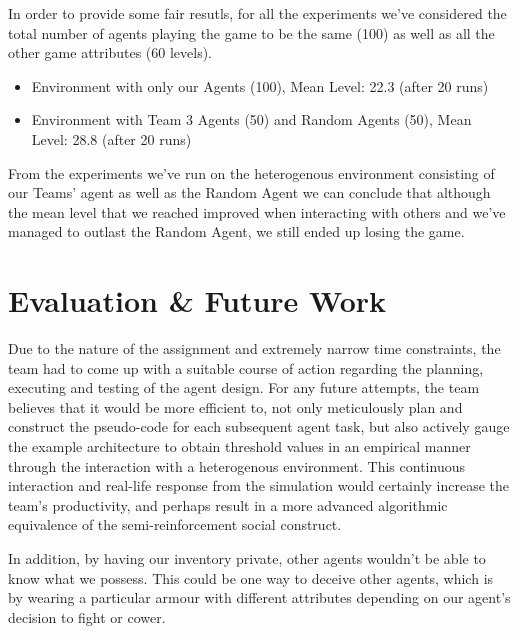 In order to provide some fair resutls, for all the experiments we've considered the total number of agents playing the game to be the same (100) as well as all the other game attributes (60 levels).
\begin{itemize}
    \item Environment with only our Agents (100), Mean Level: 22.3 (after 20 runs)
    \item Environment with Team 3 Agents (50) and Random Agents (50), Mean Level: 28.8 (after 20 runs)
\end{itemize}

From the experiments we've run on the heterogenous environment consisting of our Teams' agent as well as the Random Agent we can conclude that although the mean level that we reached improved when interacting with others and we've managed to outlast the Random Agent, we still ended up losing the game.

\section{Evaluation \& Future Work}

Due to the nature of the assignment and extremely narrow time constraints, the team had to come up with a suitable course of action regarding the planning, executing and testing of the agent design. For any future attempts, the team believes that it would be more efficient to, not only meticulously plan and construct the pseudo-code for each subsequent agent task, but also actively gauge the example architecture to obtain threshold values in an empirical manner through the interaction with a heterogenous environment. This continuous interaction and real-life response from the simulation would certainly increase the team's productivity, and perhaps result in a more advanced algorithmic equivalence of the semi-reinforcement social construct.

In addition, by having our inventory private, other agents wouldn't be able to know what we possess. This could be one way to deceive other agents, which is by wearing a particular armour with different attributes depending on our agent's decision to fight or cower. 